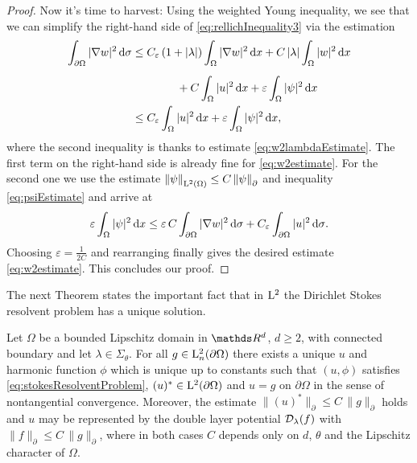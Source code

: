 \begin{proof}
  Now it's time to harvest: 
  Using the weighted Young inequality, we see that we can simplify the right-hand side of \eqref{eq:rellichInequality3} via the estimation
  \begin{align*}
    \int_{\partial\Omega} |\nabla w|^2 \, {\operatorname{d}\!{\sigma}} 
    &\leq C_\varepsilon\,  (1 + |\lambda|) \int_{\Omega} |\nabla w|^2 \, {\operatorname{d}\!{x}} + C\,  |\lambda| \int_\Omega |w|^2 \, {\operatorname{d}\!{x}} \\[0.5em]
    &\qquad\qquad+ C \int_\Omega |u|^2 \, {\operatorname{d}\!{x}} + \varepsilon \int_\Omega |\psi|^2 \, {\operatorname{d}\!{x}}  \\
    &\leq C_\varepsilon \int_\Omega |u|^2 \, {\operatorname{d}\!{x}} + \varepsilon \int_\Omega |\psi|^2 \, {\operatorname{d}\!{x}},
  \end{align*}
  where the second inequality is thanks to estimate \eqref{eq:w2lambdaEstimate}.
  The first term on the right-hand side is already fine for \eqref{eq:w2estimate}.
  For the second one we use the estimate $\|\psi\|^{}_{\mathrm{L}^2(\Omega)} \leq C\, \|\psi\|^{}_\partial$ and inequality \eqref{eq:psiEstimate} and arrive at
  \begin{align*}
    \varepsilon \int_\Omega |\psi|^2 \, {\operatorname{d}\!{x}} \leq \varepsilon \, C \int_{\partial\Omega} |\nabla w|^2 \, {\operatorname{d}\!{\sigma}} + C_\varepsilon \int_{\partial\Omega} |u|^2 \, {\operatorname{d}\!{\sigma}}.
  \end{align*}
  Choosing $\varepsilon = \frac{1}{2 C}$ and rearranging finally gives the desired estimate \eqref{eq:w2estimate}.
  This concludes our proof.
\end{proof}

The next Theorem states the important fact that in $\mathrm{L}^2$ the Dirichlet Stokes resolvent problem has a unique solution.

\begin{thm}
  \label{thm:exAndUniqueSolution}
  Let $\Omega$ be a bounded Lipschitz domain in $\R^d$, $d \geq 2$, with connected boundary and let $\lambda \in \Sigma_\theta$.
  For all $g \in \mathrm{L}^2_n(\partial\Omega)$ there exists a unique $u$ and harmonic function $\phi$ which is unique up to constants such that $(u,\phi)$ satisfies \eqref{eq:stokesResolventProblem}, $(u)^* \in \mathrm{L}^2(\partial\Omega)$ and $u = g$ on $\partial\Omega$ in the sense of nontangential convergence.
  Moreover, the estimate $ \| (u)^* \|^{}_\partial \leq C \, \| g\|^{}_\partial$ holds and $u$ may be represented by the double layer potential $\mathcal{D}_\lambda(f)$ with $\|f\|^{}_\partial \leq C \, \|g\|^{}_\partial$, where in both cases $C$ depends only on $d$, $\theta$ and the Lipschitz character of $\Omega$.
\end{thm}

